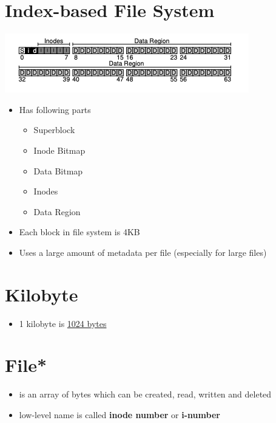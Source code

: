 \documentclass[12pt]{article}
\begin{document}
\section{Index-based File System}

\begin{center}

\includegraphics[width=\linewidth]{../images/midterm_2_solution_20.png}
\end{center}

\begin{itemize}
    \item Has following parts

    \begin{itemize}
        \item Superblock
        \item Inode Bitmap
        \item Data Bitmap
        \item Inodes
        \item Data Region
    \end{itemize}

    \item Each block in file system is 4KB
    \item Uses a large amount of metadata per file (especially for large files)
\end{itemize}

\section{Kilobyte}

\begin{itemize}
    \item 1 kilobyte is \underline{1024 bytes}
\end{itemize}

\section{File*}
\begin{itemize}
    \item is an array of bytes which can be created, read, written and deleted
    \item low-level name is called \textbf{inode number} or \textbf{i-number}
\end{itemize}
\end{document}
